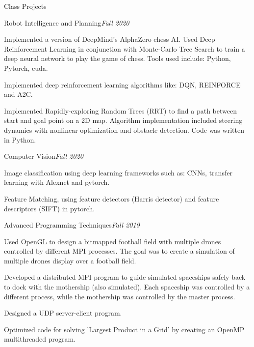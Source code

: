 \documentclass{resume} %
\begin{document}
\begin{rSection}{Class Projects}
\begin{rSubsection}{Robot Intelligence and Planning}{\em Fall 2020}{}{}
\item Implemented a version of DeepMind's AlphaZero chess AI. Used Deep Reinforcement Learning in conjunction with Monte-Carlo Tree Search to train a deep neural network to play the game of chess. Tools used include: Python, Pytorch, cuda.

\item Implemented deep reinforcement learning algorithms like: DQN, REINFORCE and A2C.

\item Implemented Rapidly-exploring Random Trees (RRT) to find a path between start and goal point on a 2D map. Algorithm implementation included steering dynamics with nonlinear optimization and obstacle detection. Code was written in Python.

\end{rSubsection}
\begin{rSubsection}{Computer Vision}{\em Fall 2020}{}{}
\item Image classification using deep learning frameworks such as: CNNs, transfer learning with Alexnet and pytorch.
\item Feature Matching, using feature detectors (Harris detector) and feature descriptors (SIFT) in pytorch.
\end{rSubsection}
\begin{rSubsection}{Advanced Programming Techniques}{\em Fall 2019}{}{}
\item Used OpenGL to design a bitmapped football field with multiple drones controlled by different MPI processes. The goal was to create a simulation of multiple drones display over a football field. 
\item Developed a distributed MPI program to guide simulated spaceships safely back to dock with the mothership (also simulated). Each spaceship was controlled by a different process, while the mothership was controlled by the master process. 
\item Designed a UDP server-client program.
\item Optimized code for solving 'Largest Product in a Grid' by creating an OpenMP multithreaded program.
\end{rSubsection}

\end{rSection}
\end{document}
